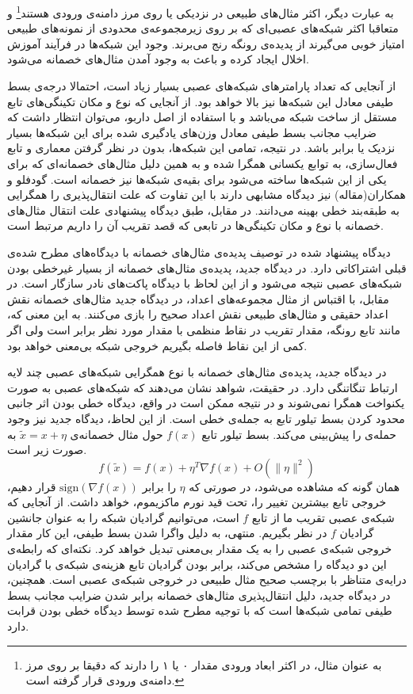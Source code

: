 \documentclass[12pt,onecolumn,a4paper]{article}
\begin{document}
به عبارت دیگر، اکثر مثال‌های طبیعی در نزدیکی یا روی مرز دامنه‌ی ورودی هستند\footnote{به عنوان مثال، در 
اکثر ابعاد ورودی مقدار ۰ یا ۱ را دارند که دقیقا بر روی مرز دامنه‌ی ورودی قرار گرفته است.}
و متعاقبا اکثر شبکه‌های عصبی‌ای که بر روی زیرمجموعه‌ی محدودی از نمونه‌های طبیعی امتیاز خوبی می‌گیرند از پدیده‌ی رونگه رنج می‌برند. وجود این شبکه‌ها در فرآیند آموزش اخلال ایجاد کرده و باعث به وجود آمدن مثال‌های خصمانه می‌شود.

از آنجایی که تعداد پارامترهای شبکه‌های عصبی بسیار زیاد است، احتمالا درجه‌ی بسط طیفی معادل این شبکه‌ها نیز بالا خواهد بود. از آنجایی که نوع و مکان تکینگی‌های تابع مستقل از ساخت شبکه می‌باشد و با استفاده از اصل داربو، می‌توان انتظار داشت که ضرایب مجانب بسط طیفی معادل وزن‌های یادگیری شده برای این شبکه‌ها بسیار نزدیک یا برابر باشد. در نتیجه، تمامی این شبکه‌ها، بدون در نظر گرفتن معماری و تابع فعال‌سازی، به توابع یکسانی همگرا شده و به همین دلیل مثال‌های خصمانه‌ای که برای یکی از این شبکه‌ها ساخته می‌شود برای بقیه‌ی شبکه‌ها نیز خصمانه است. گودفلو و همکاران(مقاله) نیز دیدگاه مشابهی دارند با این تفاوت که علت انتقال‌پذیری را همگرایی به طبقه‌بند خطی بهینه می‌دانند. در مقابل، طبق دیدگاه پیشنهادی علت انتقال مثال‌های خصمانه با نوع و مکان تکینگی‌ها در تابعی که قصد تقریب آن را داریم مرتبط است.

دیدگاه پیشنهاد شده در توصیف پدیده‌ی مثال‌های خصمانه با دیدگاه‌های مطرح شده‌ی قبلی اشتراکاتی دارد. در دیدگاه جدید، پدیده‌ی مثال‌های خصمانه از بسیار غیرخطی بودن شبکه‌های عصبی نتیجه می‌شود و از این لحاظ با دیدگاه پاکت‌های نادر سازگار است. در مقابل، با اقتباس از مثال مجموعه‌های اعداد، در دیدگاه جدید مثال‌های خصمانه نقش اعداد حقیقی و مثال‌های طبیعی نقش اعداد صحیح را بازی می‌کنند. به این معنی که، مانند تابع رونگه، مقدار تقریب در نقاط منظمی با مقدار مورد نظر برابر است ولی اگر کمی از این نقاط فاصله بگیریم خروجی شبکه بی‌معنی خواهد بود.

در دیدگاه جدید، پدیده‌ی مثال‌های خصمانه با نوع همگرایی شبکه‌های عصبی چند لایه ارتباط تنگاتنگی دارد. در حقیقت، شواهد نشان می‌دهند که شبکه‌های عصبی به صورت یکنواخت همگرا نمی‌شوند و در نتیجه ممکن است در واقع، دیدگاه خطی بودن اثر جانبی محدود کردن بسط تیلور تابع به جمله‌ی خطی است. از این لحاظ، دیدگاه جدید نیز وجود حمله‌ی
را پیش‌بینی می‌کند. بسط تیلور تابع $f(x)$ حول مثال خصمانه‌ی $\tilde{x}=x+\eta$ به صورت زیر است.
\begin{equation*}
f(\tilde{x})=f(x)+\eta^T\nabla f(x) + O(\|\eta\|^2)
\end{equation*}
همان گونه که مشاهده می‌شود، در صورتی که $\eta$ را برابر $\mathrm{sign}(\nabla f(x))$ قرار دهیم، خروجی تابع بیشترین تغییر را، تحت قید نورم ماکزیموم، خواهد داشت. از آنجایی که شبکه‌ی عصبی تقریب ما از تابع $f$ است، می‌توانیم گرادیان شبکه را به عنوان جانشین گرادیان $f$ در نظر بگیریم. منتهی، به دلیل واگرا شدن بسط طیفی، این کار مقدار خروجی شبکه‌ی عصبی را به یک مقدار بی‌معنی تبدیل خواهد کرد. نکته‌ای که رابطه‌ی این دو دیدگاه را مشخص می‌کند، برابر بودن گرادیان تابع هزینه‌ی شبکه‌ی  با گرادیان درایه‌ی متناظر با برچسب صحیح مثال طبیعی در خروجی شبکه‌ی عصبی است. همچنین، در دیدگاه جدید، دلیل انتقال‌پذیری مثال‌های خصمانه برابر شدن ضرایب مجانب بسط طیفی تمامی شبکه‌ها است که با توجیه مطرح شده توسط دیدگاه خطی بودن قرابت دارد.
\end{document}
